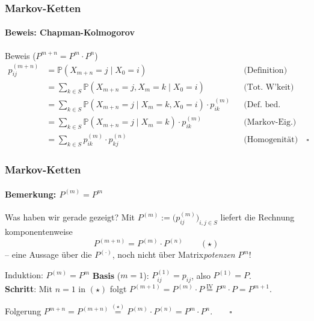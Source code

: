 \documentclass{beamer}
\newcommand{\PP}{\mathbb{P}}
\begin{document}

\begin{frame}
    \frametitle{Markov-Ketten}
\framesubtitle{Beweis: Chapman-Kolmogorov}
    \begin{block}{Beweis ($P^{m+n} = P^m \cdot P^n$)}
\small
\begin{align*}
p_{ij}^{(m+n)} &= \PP(X_{m+n} = j \mid X_0 = i) & &\text{(Definition)}\\
&= \sum_{k \in S} \PP(X_{m+n} = j, X_m = k \mid X_0 = i) & &\text{(Tot.\ W'keit)}\\
&= \sum_{k \in S} \PP(X_{m+n}\! =\! j \mid X_m\! =\! k, X_0\! =\! i) \cdot p_{ik}^{(m)} & &\text{(Def.\ bed.\ W'keit)}\\
&= \sum_{k \in S} \PP(X_{m+n} = j \mid X_m = k) \cdot p_{ik}^{(m)} & &\text{(Markov-Eig.)}\\
&= \sum_{k \in S} p_{ik}^{(m)} \cdot p_{kj}^{(n)} & &\text{(Homogenität)} \quad \square
\end{align*}
\end{block}
 \end{frame}



\begin{frame}
    \frametitle{Markov-Ketten}
\framesubtitle{Bemerkung: $P^{(m)} = P^m$}
\begin{block}{Was haben wir gerade gezeigt?}
Mit $P^{(m)} := \bigl(p_{ij}^{(m)}\bigr)_{i,j \in S}$ liefert die Rechnung komponentenweise
\[
P^{(m+n)} = P^{(m)} \cdot P^{(n)} \qquad (\star)
\]
-- eine Aussage über die $P^{(\cdot)}$, noch nicht über Matrix\emph{potenzen} $P^m$!
\end{block}
\begin{block}{Induktion: $P^{(m)} = P^m$}
\textbf{Basis} ($m=1$): $P^{(1)}_{ij} = p_{ij}$, also $P^{(1)} = P$.\\
\textbf{Schritt}: Mit $n=1$ in $(\star)$ folgt
$P^{(m+1)} = P^{(m)} \cdot P \stackrel{\text{IV}}{=} P^m \cdot P = P^{m+1}.$
\end{block}
\begin{block}{Folgerung}
$P^{m+n} = P^{(m+n)} \stackrel{(\star)}{=} P^{(m)} \cdot P^{(n)} = P^m \cdot P^n. \qquad \square$
\end{block}
 \end{frame}
\end{document}
